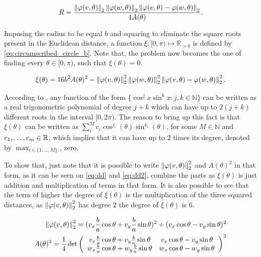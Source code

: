 \begin{equation}\label{eq:circumscribed_circle}
R = \dfrac{\left\lVert\varphi(v, \theta)\right\rVert_{2}\left\lVert\varphi(w, \theta)\right\rVert_{2}\left\lVert\varphi(v, \theta)-\varphi(w, \theta)\right\rVert_{2}   }{4A(\theta)}.
\end{equation}

Imposing the radius to be equal $b$ and squaring to eliminate the square roots present in the Euclidean distance, a function $\xi : [0, \pi) \mapsto \mathbb{R}_{>0}$ is defined by \autoref{eq:circumscribed_circle_b}. Note that, the problem now becomes the one of finding every $\theta \in [0, \pi)$, such that $\xi(\theta)=0$.

\begin{equation}\label{eq:circumscribed_circle_b}
\xi(\theta) = 16b^2A(\theta)^2 - \left\lVert\varphi(v, \theta)\right\rVert_{2}^2\left\lVert\varphi(w, \theta)\right\rVert_{2}^2\left\lVert\varphi(v, \theta)-\varphi(w, \theta)\right\rVert_{2}^2.
\end{equation}

According to , any function of the form $\{\cos^j{x}\sin^k{x} : j, k \in \mathbb{N}\}$ can be written as a real trigonometric polynomial of degree $j+k$ which can have up to $2(j+k)$ different roots in the interval $[0, 2\pi)$. The reason to bring up this fact is that $\xi(\theta)$ can be written as $\sum_i^M c_i \cos^{j_i}(\theta)\sin^{k_i}(\theta)$, for some $M \in \mathbb{N}$ and $c_1, \dots, c_m \in \mathbb{R}$, which implies that it can have up to $2$ times its degree, denoted by $\max_{i\in \{1, \dots, M\}}$, zero.

 To show that, just note that it is possible to write $\left\lVert\varphi(v, \theta)\right\rVert_{2}^2$ and $A(\theta)^2$ in that form, as it can be seen on \autoref{eq:dd} and \autoref{eq:dd2}, combine the parts as $\xi(\theta)$ is just addition and multiplication of terms in that form. It is also possible to see that the term of higher the degree of $\xi(\theta)$ is the multiplication of the three squared distances, as $\left\lVert\varphi(v, \theta)\right\rVert_{2}^2$ has degree $2$ the degree of $\xi(\theta)$ is $6$.


\begin{align}\label{eq:dd}
	\left\lVert\varphi(v, \theta)\right\rVert_{2}^2 = (v_x\frac{b}{a}\cos\theta + v_y\frac{b}{a}\sin\theta)^2 + (v_x\cos\theta - v_y\sin\theta)^2\\
	\label{eq:dd2} A(\theta)^2=\dfrac{1}{4}\det\left(
	\begin{array}{cc}
		v_x\frac{b}{a}\cos\theta + v_y\frac{b}{a}\sin\theta&v_x\cos\theta - v_y\sin\theta\\
		w_x\frac{b}{a}\cos\theta + w_y\frac{b}{a}\sin\theta&w_x\cos\theta - w_y\sin\theta
	\end{array}\right)^2
\end{align}

